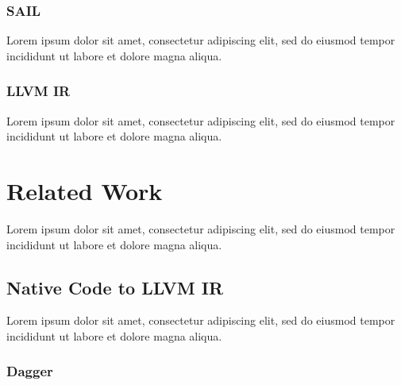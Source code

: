 \documentclass[12pt, a4paper]{article}
\begin{document}

\subsubsection{SAIL}


Lorem ipsum dolor sit amet, consectetur adipiscing elit, sed do eiusmod tempor incididunt ut labore et dolore magna aliqua.


\subsubsection{LLVM IR}

Lorem ipsum dolor sit amet, consectetur adipiscing elit, sed do eiusmod tempor incididunt ut labore et dolore magna aliqua.

\pagebreak


\section{Related Work}

Lorem ipsum dolor sit amet, consectetur adipiscing elit, sed do eiusmod tempor incididunt ut labore et dolore magna aliqua.


\subsection{Native Code to LLVM IR}


Lorem ipsum dolor sit amet, consectetur adipiscing elit, sed do eiusmod tempor incididunt ut labore et dolore magna aliqua.


\subsubsection{Dagger}
\end{document}

